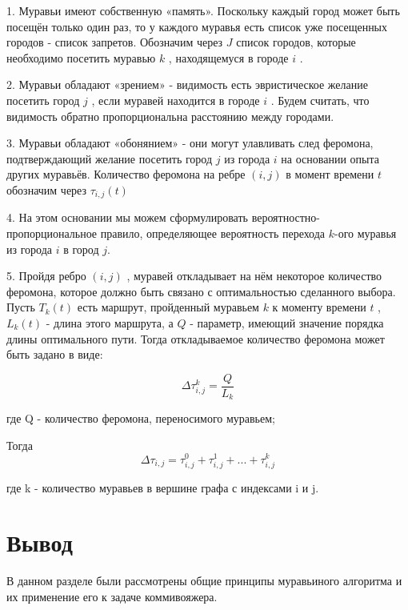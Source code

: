 \documentclass[12pt]{report}
\begin{document}
1. Муравьи имеют собственную «память». Поскольку каждый город может быть посещён только один раз, то у каждого муравья есть список уже посещенных городов - список запретов. Обозначим через $J$ список городов, которые необходимо посетить муравью $k$ , находящемуся в городе $i$ . 

2. Муравьи обладают «зрением» - видимость есть эвристическое желание посетить город $j$ , если муравей находится в городе $i$ . Будем считать, что видимость обратно пропорциональна расстоянию между городами. 

3. Муравьи обладают «обонянием» - они могут улавливать след феромона, подтверждающий желание посетить город $j$ из города $i$ на основании опыта других муравьёв. Количество феромона на ребре $(i,j)$ в момент времени $t$ обозначим через  $\tau _{i,j} (t)$ 

4. На этом основании мы можем сформулировать вероятностно-пропорциональное правило, определяющее вероятность перехода $k$-ого муравья из города $i$  в город $j$. 

5. Пройдя ребро $(i,j)$ , муравей откладывает на нём некоторое количество феромона, которое должно быть связано с оптимальностью сделанного выбора. Пусть $T _{k} (t)$ есть маршрут, пройденный муравьем $k$ к моменту времени $t$ , $L _{k} (t)$ - длина этого маршрута, а $Q$ - параметр, имеющий значение порядка длины оптимального пути. Тогда откладываемое количество феромона может быть задано в виде:

\begin{equation}\label{form:add} 
	\Delta \tau_{i,j}^k=\frac{Q}{L_{k}}
\end{equation}

где Q - количество феромона, переносимого муравьем;

\vspace{\baselineskip}

Тогда
\begin{equation}\label{form:add1} 
	\Delta \tau _{i,j}= \tau _{i,j}^0 + \tau _{i,j}^1 + ... + \tau _{i,j}^k 
\end{equation}

где k - количество муравьев в вершине графа с индексами i и j.

\section{Вывод}
\hspace*{5mm} В данном разделе были рассмотрены общие принципы муравьиного алгоритма и их применение его к задаче коммивояжера. 
\end{document}
